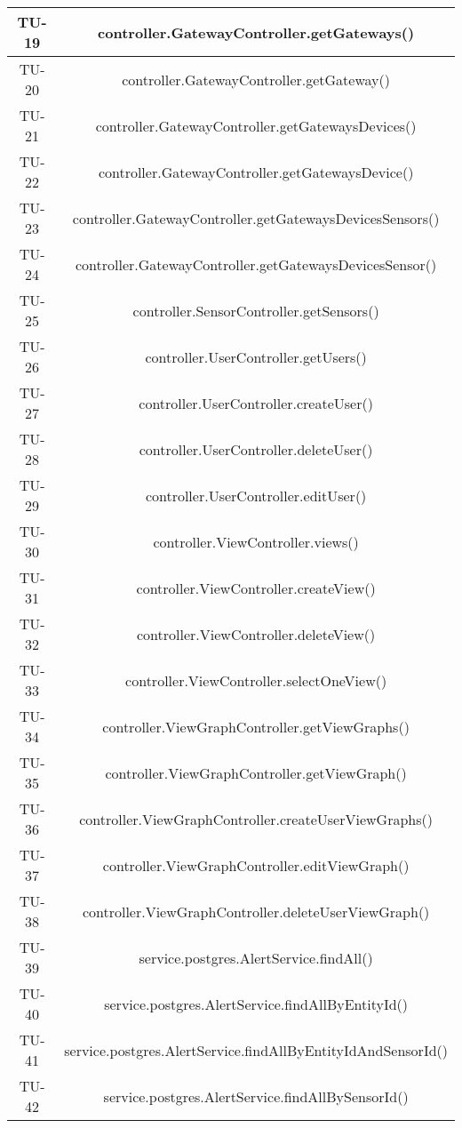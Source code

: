 \begin{center}
\begin{longtable}{|c|c|}
			\hline
			TU-19 & controller.GatewayController.getGateways() \\
			\hline
			TU-20 & controller.GatewayController.getGateway() \\
			\hline
			TU-21 & controller.GatewayController.getGatewaysDevices() \\
			\hline
			TU-22 & controller.GatewayController.getGatewaysDevice() \\
			\hline
			TU-23 & controller.GatewayController.getGatewaysDevicesSensors() \\
			\hline
			TU-24 & controller.GatewayController.getGatewaysDevicesSensor() \\
			\hline
			TU-25 & controller.SensorController.getSensors() \\
			\hline
			TU-26 & controller.UserController.getUsers() \\
			\hline
			TU-27 & controller.UserController.createUser() \\
			\hline
			TU-28 & controller.UserController.deleteUser() \\
			\hline
			TU-29 & controller.UserController.editUser() \\
			\hline
			TU-30 & controller.ViewController.views() \\
			\hline
			TU-31 & controller.ViewController.createView() \\
			\hline
			TU-32 & controller.ViewController.deleteView() \\
			\hline
			TU-33 & controller.ViewController.selectOneView() \\
			\hline
			TU-34 & controller.ViewGraphController.getViewGraphs() \\
			\hline
			TU-35 & controller.ViewGraphController.getViewGraph() \\
			\hline
			TU-36 & controller.ViewGraphController.createUserViewGraphs() \\
			\hline
			TU-37 & controller.ViewGraphController.editViewGraph() \\
			\hline
			TU-38 & controller.ViewGraphController.deleteUserViewGraph() \\
			\hline
			TU-39 & service.postgres.AlertService.findAll() \\
			\hline
			TU-40 & service.postgres.AlertService.findAllByEntityId() \\
			\hline
			TU-41 & service.postgres.AlertService.findAllByEntityIdAndSensorId() \\
			\hline
			TU-42 & service.postgres.AlertService.findAllBySensorId() \\

\end{longtable}
\end{center}
